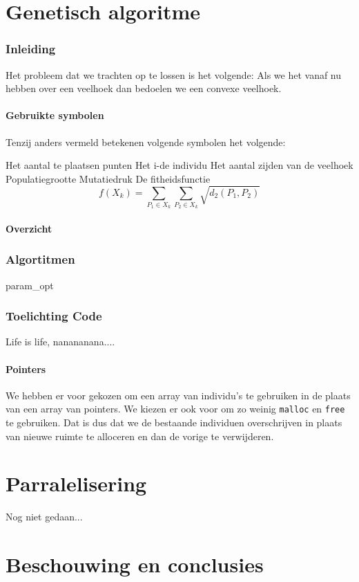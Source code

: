 

\part{Genetisch algoritme}
\section{Inleiding}
\label{sec:inleiding}
Het probleem dat we trachten op te lossen is het volgende: %
Als we het vanaf nu hebben over een veelhoek dan bedoelen we een convexe veelhoek.

\subsection{Gebruikte symbolen}
Tenzij anders vermeld betekenen volgende symbolen het volgende:
\begin{itemize}
 Het aantal te plaatsen punten
 Het i-de individu 
 Het aantal zijden van de veelhoek
 Populatiegrootte
 Mutatiedruk 
 De fitheidsfunctie \[f(X_k)= \sum_{P_1 \in X_k}\sum_{P_2 \in X_k} \sqrt{d_2(P_1,P_2)} \]
\end{itemize}

\subsection{Overzicht}
\tableofcontents


\section{Algortitmen}





 {param_opt}

\section{Toelichting Code}
Life is life, nanananana....
\label{sec:explainationcode}
\subsection{Pointers}
\label{sub:pointer}
We hebben er voor gekozen om een array van individu's te gebruiken in de plaats van een array van pointers. We kiezen er ook voor om zo weinig \texttt{malloc} en \texttt{free} te gebruiken. Dat is dus dat we de bestaande individuen overschrijven in plaats van nieuwe ruimte te alloceren en dan de vorige te verwijderen.

\part{Parralelisering}
Nog niet gedaan...

\part{Beschouwing en conclusies}


